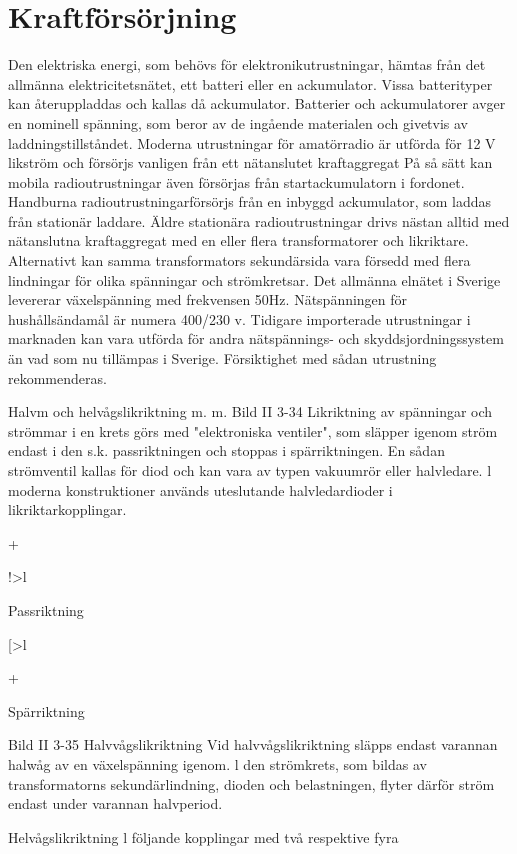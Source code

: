 \section{Kraftförsörjning}

Den elektriska energi, som behövs för elektronikutrustningar, hämtas från det allmänna elektricitetsnätet, ett batteri eller en ackumulator. Vissa batterityper kan återuppladdas och kallas då ackumulator.
Batterier och ackumulatorer avger en
nominell spänning, som beror av de ingående materialen och givetvis av laddningstillståndet. Moderna utrustningar för amatörradio är utförda för 12 V likström och försörjs
vanligen från ett nätanslutet kraftaggregat
På så sätt kan mobila radioutrustningar även
försörjas från startackumulatorn i fordonet.
Handburna radioutrustningarförsörjs från
en inbyggd ackumulator, som laddas från
stationär laddare.
Äldre stationära radioutrustningar drivs
nästan alltid med nätanslutna kraftaggregat
med en eller flera transformatorer och likriktare. Alternativt kan samma transformators
sekundärsida vara försedd med flera lindningar för olika spänningar och strömkretsar.
Det allmänna elnätet i Sverige levererar
växelspänning med frekvensen 50Hz. Nätspänningen för hushållsändamål är numera
400/230 v.
Tidigare importerade utrustningar i marknaden kan vara utförda för andra nätspännings- och skyddsjordningssystem än vad
som nu tillämpas i Sverige. Försiktighet med
sådan utrustning rekommenderas.

Halvm och helvågslikriktning m. m.
Bild II 3-34
Likriktning av spänningar och strömmar i en
krets görs med "elektroniska ventiler", som
släpper igenom ström endast i den s.k. passriktningen och stoppas i spärriktningen. En
sådan strömventil kallas för diod och kan
vara av typen vakuumrör eller halvledare. l
moderna konstruktioner används uteslutande halvledardioder i likriktarkopplingar.

+

!>l

Passriktning

[>l

+

Spärriktning

Bild II 3-35
Halvvågslikriktning
Vid halvvågslikriktning släpps endast varannan halwåg av en växelspänning igenom. l
den strömkrets, som bildas av transformatorns sekundärlindning, dioden och belastningen, flyter därför ström endast under
varannan halvperiod.

Helvågslikriktning
l följande kopplingar med två respektive fyra

